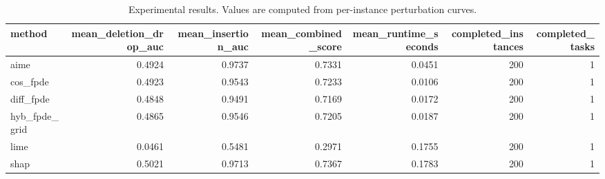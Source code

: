 \begin{table}[t]
\caption{Experimental results. Values are computed from per-instance perturbation curves.}
\label{tab:main_results_computed}
\centering
\begin{tabular}{lrrrrrr}
\toprule
method & mean\_deletion\_drop\_auc & mean\_insertion\_auc & mean\_combined\_score & mean\_runtime\_seconds & completed\_instances & completed\_tasks \\
\midrule
aime & 0.4924 & 0.9737 & 0.7331 & 0.0451 & 200 & 1 \\
cos\_fpde & 0.4923 & 0.9543 & 0.7233 & 0.0106 & 200 & 1 \\
diff\_fpde & 0.4848 & 0.9491 & 0.7169 & 0.0172 & 200 & 1 \\
hyb\_fpde\_grid & 0.4865 & 0.9546 & 0.7205 & 0.0187 & 200 & 1 \\
lime & 0.0461 & 0.5481 & 0.2971 & 0.1755 & 200 & 1 \\
shap & 0.5021 & 0.9713 & 0.7367 & 0.1783 & 200 & 1 \\
\bottomrule
\end{tabular}

\end{table}
